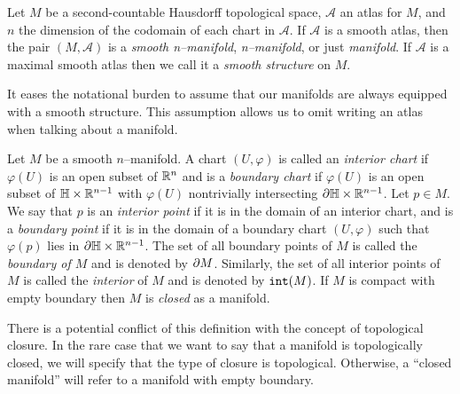 \begin{defn}[Manifold]
	\label{def:manifold}
	Let $M$ be a second-countable Hausdorff topological space, $\mathcal{A}$ an atlas for $M$, and $n$ the dimension of the codomain of each chart in $\mathcal{A}$.
	If $\mathcal{A}$ is a smooth atlas, then the pair $(M,\mathcal{A})$ is a \emph{smooth n--manifold},  \emph{n--manifold}, or just \emph{manifold}.
	If $\mathcal{A}$ is a maximal smooth atlas then we call it a \emph{smooth structure} on $M$.
\end{defn}

It eases the notational burden to assume that our manifolds are always equipped with a smooth structure.
This assumption allows us to omit writing an atlas when talking about a manifold.
	
\begin{defn}[Boundary]
	\label{def:boundary}
	Let $M$ be a smooth $n$--manifold.
	A chart $(U,\varphi)$ is called an \emph{interior chart} if $\varphi(U)$ is an open subset of $\mathbb{R}^n$ and is a \emph{boundary chart} if $\varphi(U)$ is an open subset of $\mathbb{H}\times\mathbb{R}^{n-1}$ with $\varphi(U)$ nontrivially intersecting $\partial \mathbb{H}\times\mathbb{R}^{n-1}$.
	Let $p\in M$.
	We say that $p$ is an \emph{interior point} if it is in the domain of an interior chart, and is a \emph{boundary point} if it is in the domain of a boundary chart $(U,\varphi)$ such that $\varphi(p)$ lies in $\partial\mathbb{H}\times\mathbb{R}^{n-1}$.
	The set of all boundary points of $M$ is called the \emph{boundary of $M$} and is denoted by $\partial M$.
	Similarly, the set of all interior points of $M$ is called the \emph{interior} of $M$ and is denoted by $\mathtt{int}(M)$.
	If $M$ is compact with empty boundary then $M$ is \emph{closed} as a manifold.
\end{defn}

There is a potential conflict of this definition with the concept of topological closure.
In the rare case that we want to say that a manifold is topologically closed, we will specify that the type of closure is topological.
Otherwise, a ``closed manifold'' will refer to a manifold with empty boundary.

